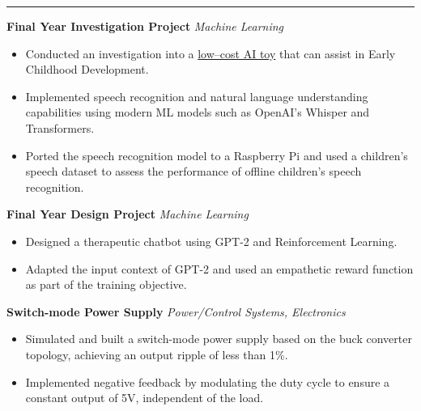 \documentclass[10pt, a4paper]{article}
\newcommand{\contentType}[1]{\textit{#1}}
\newcommand{\heading}[1]{
\makebox[0pt][l]{\Large \sc \hspace{2pt}#1}
\rule[-0.7ex]{\columnwidth}{0.5pt}\vspace{1.0ex}
}
\newcommand{\subheading}[1]{{\bfseries #1}}
\newcommand{\subheadSkip}{\vspace{0.7ex}}
\newenvironment{mysection}[1]
{\vspace{2.5ex}
\heading{#1}
\begin{adjustwidth}{0.3cm}{0cm}}
{\end{adjustwidth} }
\begin{document}
\begin{mysection}{Projects}
    
    \subheading{Final Year Investigation Project} \hfill \contentType{Machine Learning}
         
     \begin{itemize}
     \item       Conducted an investigation into a \href{https://github.com/RyanSelesnik/AI-Toy}{low--cost AI toy} that can assist in Early Childhood Development. 

         \item Implemented speech recognition and natural language understanding capabilities using modern ML models such as OpenAI's Whisper and Transformers.
            \item Ported the speech recognition model to a Raspberry Pi and used a children's speech dataset to assess the performance of offline children's speech recognition.
     \end{itemize} 
\subheadSkip   
\subheading{Final Year Design Project} \hfill \contentType{Machine Learning}
 \begin{itemize}
     \item Designed a therapeutic chatbot using GPT-2 and Reinforcement Learning.
     \item Adapted the input context of GPT-2 and used an empathetic reward function as part of the training objective.
 \end{itemize} 

 \subheadSkip
 \subheading{Switch-mode Power Supply} \hfill \contentType{Power/Control Systems, Electronics}
\begin{itemize}
    \item Simulated and built a switch-mode power supply based on the buck converter topology, achieving an output ripple of less than 1\%.
    \item Implemented negative feedback by modulating the duty cycle to ensure a constant output of 5V, independent of the load. 
\end{itemize}


\end{mysection}
\end{document}
